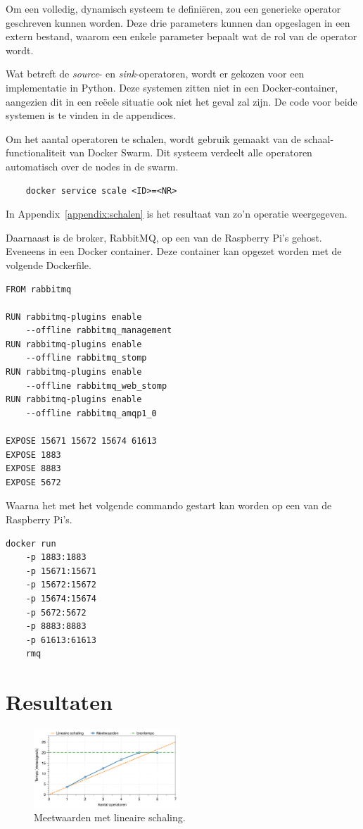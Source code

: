 \documentclass[twocolumn, a4paper]{article}
\begin{document}
Om een volledig, dynamisch systeem te definiëren, zou een generieke operator geschreven kunnen worden. Deze drie parameters kunnen dan opgeslagen in een extern bestand, waarom een enkele parameter bepaalt wat de rol van de operator wordt. 

Wat betreft de \emph{source}- en \emph{sink}-operatoren, wordt er gekozen voor een implementatie in Python. Deze systemen zitten niet in een Docker-container, aangezien dit in een reëele situatie ook niet het geval zal zijn. De code voor beide systemen is te vinden in de appendices.

Om het aantal operatoren te schalen, wordt gebruik gemaakt van de schaal-functionaliteit van Docker Swarm. Dit systeem verdeelt alle operatoren automatisch over de nodes in de swarm.
 
\begin{verbatim}
    docker service scale <ID>=<NR>
\end{verbatim}

In Appendix~\ref{appendix:schalen} is het resultaat van zo'n operatie weergegeven. 

Daarnaast is de broker, RabbitMQ, op een van de Raspberry Pi's gehost. Eveneens in een Docker container. Deze container kan opgezet worden met de volgende Dockerfile.  

\begin{verbatim}
FROM rabbitmq

RUN rabbitmq-plugins enable 
    --offline rabbitmq_management
RUN rabbitmq-plugins enable 
    --offline rabbitmq_stomp
RUN rabbitmq-plugins enable
    --offline rabbitmq_web_stomp
RUN rabbitmq-plugins enable 
    --offline rabbitmq_amqp1_0

EXPOSE 15671 15672 15674 61613
EXPOSE 1883
EXPOSE 8883
EXPOSE 5672
\end{verbatim}

Waarna het met het volgende commando gestart kan worden op een van de Raspberry Pi's. 
\begin{verbatim}
docker run  
    -p 1883:1883 
    -p 15671:15671 
    -p 15672:15672 
    -p 15674:15674 
    -p 5672:5672 
    -p 8883:8883 
    -p 61613:61613 
    rmq
\end{verbatim}

\section{Resultaten}
\begin{figure}[b]
    \centering
    \includegraphics[width=0.49\textwidth]{metingen}
    \caption{Meetwaarden met lineaire schaling.}\label{fig:metingen}
\end{figure}
\end{document}
